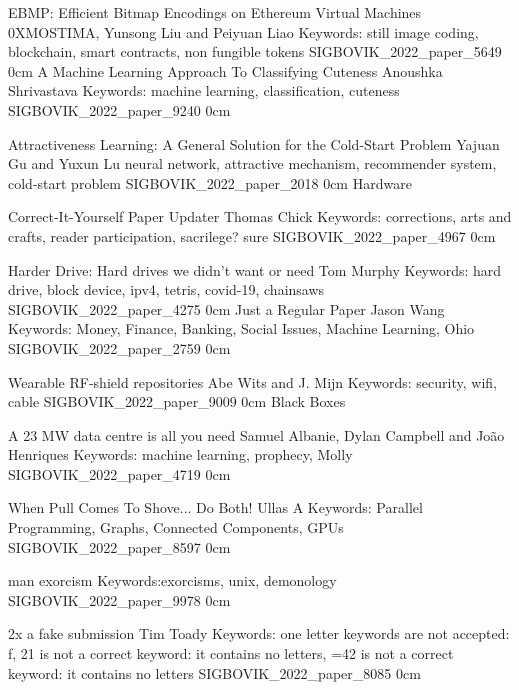 \addpaper
    {EBMP: Efficient Bitmap Encodings on Ethereum Virtual Machines}
    {0XMOSTIMA, Yunsong Liu and Peiyuan Liao}
    {Keywords: still image coding, blockchain, smart contracts, non fungible tokens}
    {SIGBOVIK_2022_paper_5649}
    {0cm}
    {}
\addpaper
    {A Machine Learning Approach To Classifying Cuteness}
    {Anoushka Shrivastava}
    {Keywords: machine learning, classification, cuteness}
    {SIGBOVIK_2022_paper_9240}
    {0cm}
    {}

\addpaper
    {Attractiveness Learning: A General Solution for the Cold-Start Problem}
    {Yajuan Gu and Yuxun Lu}
    {neural network, attractive mechanism, recommender system, cold-start problem}
    {SIGBOVIK_2022_paper_2018}
    {0cm}
    {}
\addtrack
    {}{Hardware}

\addpaper
    {Correct-It-Yourself Paper Updater}
    {Thomas Chick}
    {Keywords: corrections, arts and crafts, reader participation, sacrilege? sure}
    {SIGBOVIK_2022_paper_4967}
    {0cm}
    {}

\addpaper
    {Harder Drive: Hard drives we didn't want or need}
    {Tom Murphy}
    {Keywords: hard drive, block device, ipv4, tetris, covid-19, chainsaws}
    {SIGBOVIK_2022_paper_4275}
    {0cm}
    {}
\addpaper
    {Just a Regular Paper}
    {Jason Wang}
    {Keywords: Money, Finance, Banking, Social Issues, Machine Learning, Ohio}
    {SIGBOVIK_2022_paper_2759}
    {0cm}
    {}


\addpaper
    {Wearable RF-shield repositories}
    {Abe Wits and J. Mijn}
    {Keywords: security, wifi, cable}
    {SIGBOVIK_2022_paper_9009}
    {0cm}
    {}
\addtrack
    {}{Black Boxes}

\addpaper
    {A 23 MW data centre is all you need}
    {Samuel Albanie, Dylan Campbell and João Henriques}
    {Keywords: machine learning, prophecy, Molly}
    {SIGBOVIK_2022_paper_4719}
    {0cm}
    {}


\addpaper
    {When Pull Comes To Shove... Do Both!}
    {Ullas A}
    {Keywords: Parallel Programming, Graphs, Connected Components, GPUs}
    {SIGBOVIK_2022_paper_8597}
    {0cm}
    {}


\addpaper
    {man exorcism}
    {}
    {Keywords:exorcisms, unix, demonology}
    {SIGBOVIK_2022_paper_9978}
    {0cm}
    {}

\addpaper
    {2x a fake submission}
    {Tim Toady}
    {Keywords: one letter keywords are not accepted: f, 21 is not a correct keyword: it contains no letters, =42 is not a correct keyword: it contains no letters}
    {SIGBOVIK_2022_paper_8085}
    {0cm}
    {}

